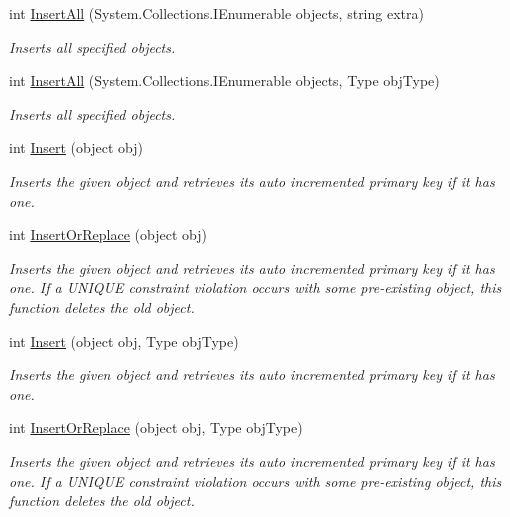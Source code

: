 \begin{DoxyCompactItemize}
int \hyperlink{classSQLite_1_1SQLiteConnection_a62b62415941ce6486f7dfa219a69f1f1}{Insert\+All} (System.\+Collections.\+I\+Enumerable objects, string extra)
\begin{DoxyCompactList}\small\item\em Inserts all specified objects. \end{DoxyCompactList}\item 
int \hyperlink{classSQLite_1_1SQLiteConnection_a08e03803dd01aa67ee56a8e6d184c9d9}{Insert\+All} (System.\+Collections.\+I\+Enumerable objects, Type obj\+Type)
\begin{DoxyCompactList}\small\item\em Inserts all specified objects. \end{DoxyCompactList}\item 
int \hyperlink{classSQLite_1_1SQLiteConnection_a937382b36e6726d12fe6d09f7bfb0ab6}{Insert} (object obj)
\begin{DoxyCompactList}\small\item\em Inserts the given object and retrieves its auto incremented primary key if it has one. \end{DoxyCompactList}\item 
int \hyperlink{classSQLite_1_1SQLiteConnection_a1c16c3dda43037326b7f2afc6c822abd}{Insert\+Or\+Replace} (object obj)
\begin{DoxyCompactList}\small\item\em Inserts the given object and retrieves its auto incremented primary key if it has one. If a U\+N\+I\+Q\+U\+E constraint violation occurs with some pre-\/existing object, this function deletes the old object. \end{DoxyCompactList}\item 
int \hyperlink{classSQLite_1_1SQLiteConnection_a19576a29af1c0891a646ff3e904f2cdc}{Insert} (object obj, Type obj\+Type)
\begin{DoxyCompactList}\small\item\em Inserts the given object and retrieves its auto incremented primary key if it has one. \end{DoxyCompactList}\item 
int \hyperlink{classSQLite_1_1SQLiteConnection_a812215a88043259b6a107994756000ae}{Insert\+Or\+Replace} (object obj, Type obj\+Type)
\begin{DoxyCompactList}\small\item\em Inserts the given object and retrieves its auto incremented primary key if it has one. If a U\+N\+I\+Q\+U\+E constraint violation occurs with some pre-\/existing object, this function deletes the old object. \end{DoxyCompactList}\item 

\end{DoxyCompactItemize}
